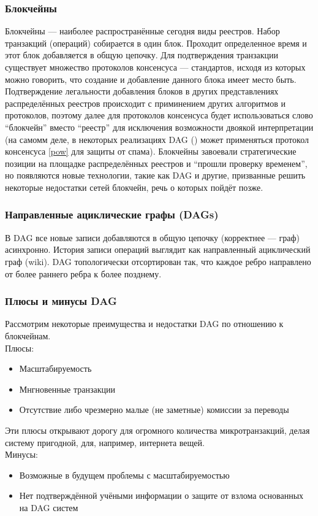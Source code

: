 \subsubsection{Блокчейны}\label{struct_block}
Блокчейны --- наиболее распространённые сегодня виды реестров. Набор транзакций
(операций) собирается в один блок. Проходит определенное время и этот блок
добавляется в общую цепочку. Для подтверждения транзакции существует множество
протоколов консенсуса --- стандартов, исходя из которых можно говорить, что
создание и добавление данного блока имеет место быть. Подтверждение легальности
добавления блоков в других представлениях распределённых реестров происходит с
приминением других алгоритмов и протоколов, поэтому далее для протоколов
консенсуса будет использоваться слово ``блокчейн'' вместо ``реестр'' для
исключения возможности двоякой интерпретации (на самомм деле, в некоторых
реализациях DAG (\cite{Popov2018}) может применяться протокол консенсуса
\ref{pow} для защиты от спама). Блокчейны завоевали стратегические позиции на
площадке распределённых реестров и ``прошли проверку временем'', но появляются
новые технологии, такие как DAG и другие, призванные решить некоторые
недостатки сетей блокчейн, речь о которых пойдёт позже.

\subsubsection{Направленные ациклические графы (DAGs)}\label{struct_dags}
В DAG все новые записи добавляются в общую цепочку (корректнее --- граф)
асинхронно. История записи операций выглядит как направленный ациклический граф
(wiki). DAG топологически отсортирован так, что каждое ребро направлено от
более раннего ребра к более позднему.

\subsubsection{Плюсы и минусы DAG}
Рассмотрим некоторые преимущества и недостатки DAG по отношению к блокчейнам.\\
Плюсы:
\begin{itemize}
    \item Масштабируемость
    \item Мнгновенные транзакции
    \item Отсутствие либо чрезмерно малые (не заметные) комиссии за переводы
\end{itemize}
Эти плюсы открывают дорогу для огромного количества микротранзакций, делая
систему пригодной, для, например, интернета вещей.\\
Минусы:
\begin{itemize}
    \item Возможные в будущем проблемы с масштабируемостью
    \item Нет подтверждённой учёными информации о защите от взлома основанных на DAG систем
\end{itemize}

